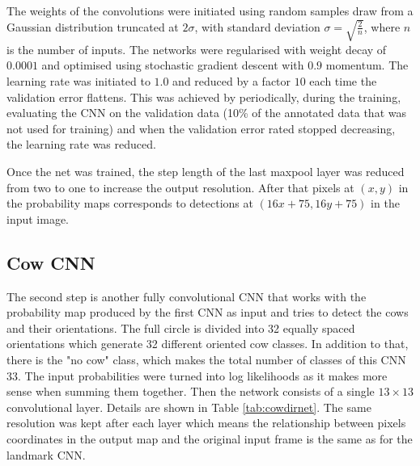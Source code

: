 \documentclass{cta-author}
\begin{document}
The weights of the convolutions were initiated using random samples draw from a Gaussian
distribution truncated at $2\sigma$, with standard deviation $\sigma=\sqrt{\frac{2}{n}}$,
where $n$ is the number of inputs\cite{DBLP:journals/corr/HeZR015}. The networks were regularised with weight
decay of
$0.0001$ and optimised using stochastic gradient descent with $0.9$ momentum. The
learning rate was initiated to $1.0$ and reduced by a factor $10$ each time the validation
error flattens. This was achieved by periodically, during the training, evaluating the CNN on the validation data
(10\% of the annotated data that was not used for training) and when the validation error rated stopped decreasing,
the learning rate was reduced.

Once the net was trained, the step length of the last maxpool layer was reduced from two to one to increase
the output resolution. After that pixels at $\left(x, y\right)$ in the probability maps corresponds to
detections at $\left(16 x + 75, 16 y + 75\right)$ in the input image.

\subsection{Cow CNN}

The second step is another fully convolutional CNN that works with the probability map produced by the first CNN
as input and tries to detect the cows and their orientations. The full circle is divided into 32 equally
spaced orientations which generate 32 different oriented cow classes. In addition to that, there is the "no
cow" class, which makes the total number of classes of this CNN 33. The input probabilities were turned into
log likelihoods as it makes more sense when summing them together. Then the network consists of a single $ 13
\times 13 $ convolutional layer. Details are shown in Table \ref{tab:cowdirnet}. The same resolution was kept
after each layer which means the relationship between pixels coordinates in the output map and the original
input frame is the same as for the landmark CNN.
\end{document}
